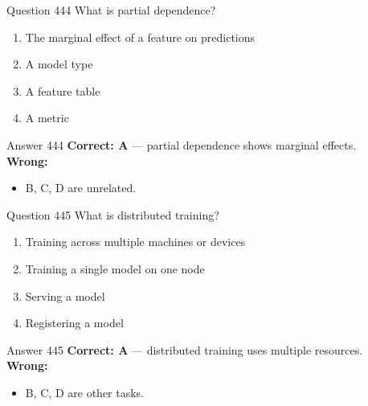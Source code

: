 \documentclass[aspectratio=169,11pt]{beamer}
\begin{document}
	\begin{frame}{Question 444}
		What is partial dependence?
		\begin{enumerate}[label=\Alph*.]
			\item The marginal effect of a feature on predictions
			\item A model type
			\item A feature table
			\item A metric
		\end{enumerate}
	\end{frame}
	\begin{frame}{Answer 444}
		\textbf{Correct: A} --- partial dependence shows marginal effects.\\
		\vspace{0.5em}
		\textbf{Wrong:}
		\begin{itemize}
			\item B, C, D are unrelated.
		\end{itemize}
	\end{frame}
	
	\begin{frame}{Question 445}
		What is distributed training?
		\begin{enumerate}[label=\Alph*.]
			\item Training across multiple machines or devices
			\item Training a single model on one node
			\item Serving a model
			\item Registering a model
		\end{enumerate}
	\end{frame}
	\begin{frame}{Answer 445}
		\textbf{Correct: A} --- distributed training uses multiple resources.\\
		\vspace{0.5em}
		\textbf{Wrong:}
		\begin{itemize}
			\item B, C, D are other tasks.
		\end{itemize}
	\end{frame}
	
\end{document}
